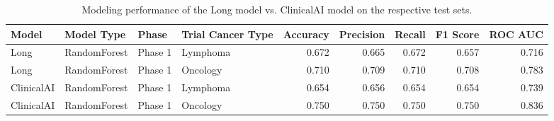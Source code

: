 \begin{table}
\caption{Modeling performance of the Long model vs. ClinicalAI model on the respective test sets.}
\label{tab:model_performance}
\begin{tabular}{llllrrrrr}
\toprule
Model & Model Type & Phase & Trial Cancer Type & Accuracy & Precision & Recall & F1 Score & ROC AUC \\
\midrule
Long & RandomForest & Phase 1 & Lymphoma & 0.672 & 0.665 & 0.672 & 0.657 & 0.716 \\
Long & RandomForest & Phase 1 & Oncology & 0.710 & 0.709 & 0.710 & 0.708 & 0.783 \\
ClinicalAI & RandomForest & Phase 1 & Lymphoma & 0.654 & 0.656 & 0.654 & 0.654 & 0.739 \\
ClinicalAI & RandomForest & Phase 1 & Oncology & 0.750 & 0.750 & 0.750 & 0.750 & 0.836 \\
\bottomrule
\end{tabular}
\end{table}
